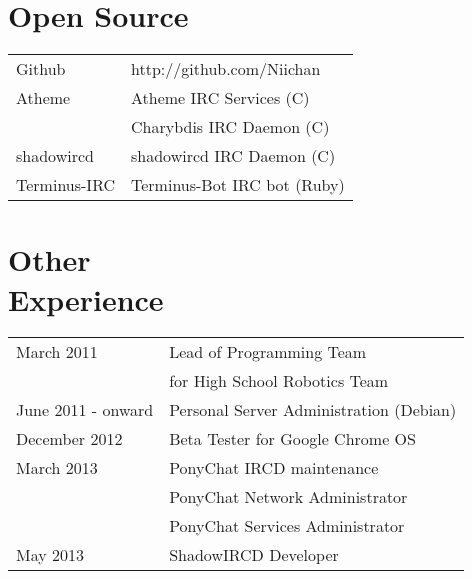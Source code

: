 \documentclass[line, margin, 12pt]{res}
\begin{document}
\begin{resume}
\section{Open Source}
\begin{tabular}{l l}
Github & http://github.com/Niichan \\ [5pt]
Atheme & Atheme IRC Services (C) \\ [5pt]
& Charybdis IRC Daemon (C) \\ [5pt]
shadowircd & shadowircd IRC Daemon (C) \\ [5pt]
Terminus-IRC & Terminus-Bot IRC bot (Ruby) \\ [5pt]
\end{tabular}
     
\section{Other \\ Experience}
\begin{tabular}{l l}
March 2011 & Lead of Programming Team \\ [5pt]
 & for High School Robotics Team \\ [10pt]
June 2011 - onward & Personal Server Administration (Debian) \\ [10pt]
December 2012 & Beta Tester for Google Chrome OS \\ [10pt]
March 2013 & PonyChat IRCD maintenance  \\ [5pt]
 & PonyChat Network Administrator \\ [5pt]
 & PonyChat Services Administrator \\ [10pt]
May 2013 & ShadowIRCD Developer \\ [5pt]
\end{tabular}
     
\end{resume}
\end{document}
